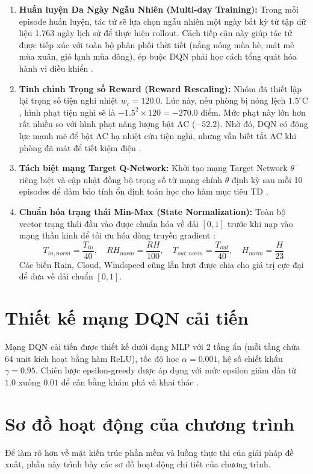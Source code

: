 \documentclass[12pt, a4paper]{report}
\begin{document}
\begin{enumerate}
    \item \textbf{Huấn luyện Đa Ngày Ngẫu Nhiên (Multi-day Training):} Trong mỗi episode huấn luyện, tác tử sẽ lựa chọn ngẫu nhiên một ngày bất kỳ từ tập dữ liệu 1.763 ngày lịch sử để thực hiện rollout. Cách tiếp cận này giúp tác tử được tiếp xúc với toàn bộ phân phối thời tiết (nắng nóng mùa hè, mát mẻ mùa xuân, gió lạnh mùa đông), ép buộc DQN phải học cách tổng quát hóa hành vi điều khiển \cite{whulx,dqn}.
    \item \textbf{Tinh chỉnh Trọng số Reward (Reward Rescaling):} Nhóm đã thiết lập lại trọng số tiện nghi nhiệt $w_c = 120.0$. Lúc này, nếu phòng bị nóng lệch $1.5^\circ\text{C}$, hình phạt tiện nghi sẽ là $-1.5^2 \times 120 = -270.0$ điểm. Mức phạt này lớn hơn rất nhiều so với hình phạt năng lượng bật AC ($-52.2$). Nhờ đó, DQN có động lực mạnh mẽ để bật AC hạ nhiệt cứu tiện nghi, nhưng vẫn biết tắt AC khi phòng đã mát để tiết kiệm điện \cite{ashrae55,whulx}.
    \item \textbf{Tách biệt mạng Target Q-Network:} Khởi tạo mạng Target Network $\theta^-$ riêng biệt và cập nhật đồng bộ trọng số từ mạng chính $\theta$ định kỳ sau mỗi 10 episodes để đảm bảo tính ổn định toán học cho hàm mục tiêu TD \cite{dqn}.
    \item \textbf{Chuẩn hóa trạng thái Min-Max (State Normalization):} Toàn bộ vector trạng thái đầu vào được chuẩn hóa về dải $[0, 1]$ trước khi nạp vào mạng thần kinh để tối ưu hóa dòng truyền gradient \cite{dqn}:
    \begin{equation}
    T_{in, norm} = \frac{T_{in}}{40}, \quad RH_{norm} = \frac{RH}{100}, \quad T_{out, norm} = \frac{T_{out}}{40}, \quad H_{norm} = \frac{H}{23}
    \end{equation}
    Các biến Rain, Cloud, Windspeed cũng lần lượt được chia cho giá trị cực đại để đưa về dải chuẩn $[0, 1]$.
\end{enumerate}

\section{Thiết kế mạng DQN cải tiến}
Mạng DQN cải tiến được thiết kế dưới dạng MLP với 2 tầng ẩn (mỗi tầng chứa 64 unit kích hoạt bằng hàm ReLU), tốc độ học $\alpha = 0.001$, hệ số chiết khấu $\gamma = 0.95$. Chiến lược epsilon-greedy được áp dụng với mức epsilon giảm dần từ $1.0$ xuống $0.01$ để cân bằng khám phá và khai thác \cite{dqn,adam}.

\section{Sơ đồ hoạt động của chương trình}
Để làm rõ hơn về mặt kiến trúc phần mềm và luồng thực thi của giải pháp đề xuất, phần này trình bày các sơ đồ hoạt động chi tiết của chương trình.
\end{document}
